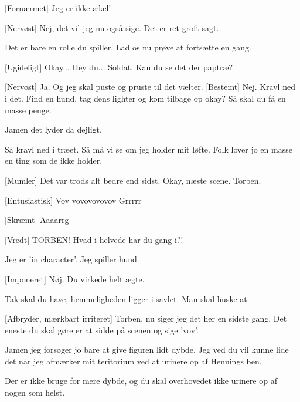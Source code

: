 \documentclass[a4paper,11pt]{article}
\begin{document}
\begin{sketch}
[Fornærmet] Jeg er ikke ækel!

[Nervøst] Nej, det vil jeg nu også sige. Det er ret groft sagt.

 Det er bare en rolle du spiller. Lad os nu prøve at fortsætte en gang. 

[Ugideligt] Okay...  Hey du... Soldat. Kan du se det der paptræ?   

[Nervøst] Ja. Og jeg skal puste og pruste til det vælter.
[Bestemt] Nej. Kravl ned i det. Find en hund, tag dens lighter og kom tilbage op okay? Så skal du få en masse penge. 

 Jamen det lyder da dejligt.

 Så kravl ned i træet.  Så må vi se om jeg holder mit løfte. Folk lover jo en masse en ting som de ikke holder.


[Mumler] Det var trods alt bedre end sidst.  Okay, næste scene. Torben.


[Entusiastisk] Vov vovovovovov  Grrrrr

[Skræmt] Aaaarrg  

[Vredt] TORBEN! Hvad i helvede har du gang i?!
 
  Jeg er 'in character'. Jeg spiller hund. 


[Imponeret] Nøj. Du virkede helt ægte.

 Tak skal du have, hemmeligheden ligger i savlet. Man skal huske at 

[Afbryder, mærkbart irriteret] Torben, nu siger jeg det her en sidste gang. Det eneste du skal gøre er at sidde på scenen og sige 'vov'. 

 Jamen jeg forsøger jo bare at give figuren lidt dybde. Jeg ved du vil kunne lide det når jeg afmærker mit teritorium ved at urinere op af Hennings ben.

 Der er ikke bruge for mere dybde, og du skal overhovedet ikke urinere op af nogen som helst. 


\end{sketch}
\end{document}
